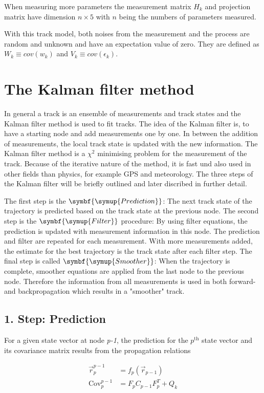 When measuring more parameters the measurement matrix $H_k$ and projection matrix have dimension $n\times5$ with $n$ being the numbers of parameters measured.

With this track model, both noises from the measurement and the process are random and unknown and have an expectation value of zero.
They are defined as $W_k \equiv cov(w_k)$ and $V_k \equiv cov(\epsilon_k)$.

\section{The Kalman filter method \cite{VanTilburg}}
In general a track is an ensemble of measurements and track states and the Kalman filter method is used to fit tracks.
The idea of the Kalman filter is, to have a starting node and add measurements one by one. In between the addition of measurements, the local track state is updated with the new information.
The Kalman filter method is a $\chi^2$ minimising problem for the measurement of the track. Because of the iterative nature of the method, it is fast und also used in other fields than physics, for example GPS and meteorology.
The three steps of the Kalman filter will be briefly outlined and later discribed in further detail.


The first step is the $\symbf{\symup{Prediction}}$: The next track state of the trajectory is predicted based on the track state at the previous node.
The second step is the $\symbf{\symup{Filter}}$ procedure: By using filter equations, the prediction is updated with measurement information in this node. The prediction and filter are repeated for each measurement. With more measurements added, the estimate for the best trajectory is the track state after each filter step.
The final step is called $\symbf{\symup{Smoother}}$: When the trajectory is complete, smoother equations are applied from the last node to the previous node. Therefore the information from all measurements is used in both forward- and backpropagation which results in a "smoother" track.

\subsection{1. Step: Prediction}
For a given state vector at node \textit{p-1}, the prediction for the $p^{\text{th}}$ state vector and its covariance matrix results from the propagation relations

\begin{align}
  \vec{r}_p^{p-1} &= f_p\left( \vec{r}_{p-1} \right) \\
  \text{Cov}_p^{p-1} &= F_p C_{p-1} F_p^T + Q_k
\end{align}

